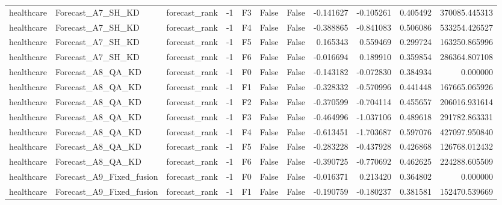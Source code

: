 \begin{tabular}{lllrlllrrrr}
healthcare &            Forecast\_A7\_SH\_KD & forecast\_rank &    -1 &  F3 &           False &            False & -0.141627 & -0.105261 & 0.405492 &    370085.445313 \\
healthcare &            Forecast\_A7\_SH\_KD & forecast\_rank &    -1 &  F4 &           False &            False & -0.388865 & -0.841083 & 0.506086 &    533254.426527 \\
healthcare &            Forecast\_A7\_SH\_KD & forecast\_rank &    -1 &  F5 &           False &            False &  0.165343 &  0.559469 & 0.299724 &    163250.865996 \\
healthcare &            Forecast\_A7\_SH\_KD & forecast\_rank &    -1 &  F6 &           False &            False & -0.016694 &  0.189910 & 0.359854 &    286364.807108 \\
healthcare &            Forecast\_A8\_QA\_KD & forecast\_rank &    -1 &  F0 &           False &            False & -0.143182 & -0.072830 & 0.384934 &         0.000000 \\
healthcare &            Forecast\_A8\_QA\_KD & forecast\_rank &    -1 &  F1 &           False &            False & -0.328332 & -0.570996 & 0.441448 &    167665.065926 \\
healthcare &            Forecast\_A8\_QA\_KD & forecast\_rank &    -1 &  F2 &           False &            False & -0.370599 & -0.704114 & 0.455657 &    206016.931614 \\
healthcare &            Forecast\_A8\_QA\_KD & forecast\_rank &    -1 &  F3 &           False &            False & -0.464996 & -1.037106 & 0.489618 &    291782.863331 \\
healthcare &            Forecast\_A8\_QA\_KD & forecast\_rank &    -1 &  F4 &           False &            False & -0.613451 & -1.703687 & 0.597076 &    427097.950840 \\
healthcare &            Forecast\_A8\_QA\_KD & forecast\_rank &    -1 &  F5 &           False &            False & -0.283228 & -0.437928 & 0.426868 &    126768.012432 \\
healthcare &            Forecast\_A8\_QA\_KD & forecast\_rank &    -1 &  F6 &           False &            False & -0.390725 & -0.770692 & 0.462625 &    224288.605509 \\
healthcare &     Forecast\_A9\_Fixed\_fusion & forecast\_rank &    -1 &  F0 &           False &            False & -0.016371 &  0.213420 & 0.364802 &         0.000000 \\
healthcare &     Forecast\_A9\_Fixed\_fusion & forecast\_rank &    -1 &  F1 &           False &            False & -0.190759 & -0.180237 & 0.381581 &    152470.539669 \\

\end{tabular}
